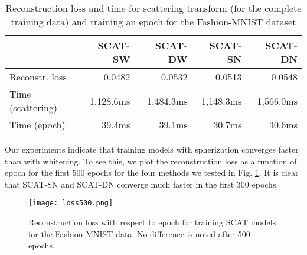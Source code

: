 \documentclass[conference]{IEEEtran}
\begin{document}
\begin{table}[b]
\caption{Reconstruction loss and time for scattering transform (for the complete training data) and training an epoch for the Fashion-MNIST dataset}\label{tab:epochsignal}
\centering
\begin{tabular}{lrrrr}
~    &   SCAT-SW    &    SCAT-DW    &    SCAT-SN & SCAT-DN    \\
\hline
Reconstr. loss   &   0.0482    &  0.0532     &      0.0513 & 0.0548     \\
Time (scattering)     &  1,128.6ms     & 1,484.3ms     &   1,148.3ms & 1,566.0ms      \\
Time (epoch)      &  39.4ms     &  39.1ms     &    30.7ms & 30.6ms       \\
\end{tabular}
\end{table}

Our experiments indicate that training models with spherization converges faster than with whitening. To see this, we plot the reconstruction loss as a function of epoch for the first 500 epochs for the four methods we tested in Fig. \ref{fig:loss}. It is clear that SCAT-SN and SCAT-DN converge much faster in the first 300 epochs.


\begin{figure}[ht]
    \centering
    \texttt{[image: loss500.png]}
    \caption{Reconstruction loss with respect to epoch for training SCAT models for the Fashion-MNIST data. No difference is noted after 500 epochs.} 
    \label{fig:loss}
\end{figure}
\end{document}
